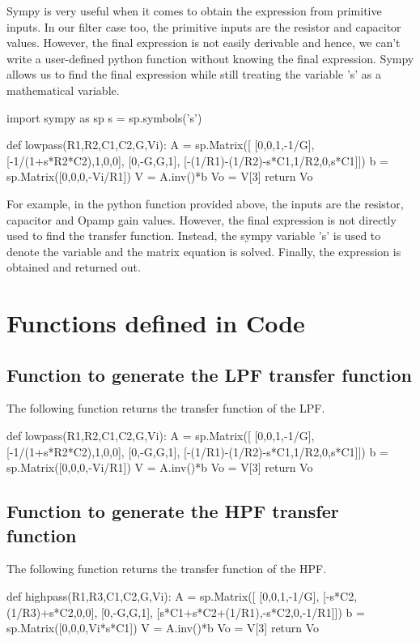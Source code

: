 \documentclass[12pt, a4paper]{article}
\begin{document}
Sympy is very useful when it comes to obtain the expression from primitive
inputs. In our filter case too, the primitive inputs are the resistor and capacitor
values. However, the final expression is not easily derivable and hence, we
can't write a user-defined python function without knowing the final expression.
Sympy allows us to find the final expression while still treating the variable 's'
as a mathematical variable.
\begin{py_code}
    import sympy as sp
    s = sp.symbols('s')

    def lowpass(R1,R2,C1,C2,G,Vi):
        A = sp.Matrix([ [0,0,1,-1/G], [-1/(1+s*R2*C2),1,0,0], [0,-G,G,1], [-(1/R1)-(1/R2)-s*C1,1/R2,0,s*C1]])
        b = sp.Matrix([0,0,0,-Vi/R1])
        V = A.inv()*b
        Vo = V[3]
        return Vo
\end{py_code}
For example, in the python function provided above, the inputs are the resistor,
capacitor and Opamp gain values. However, the final expression is not directly
used to find the transfer function. Instead, the sympy variable ’s’ is used to
denote the variable and the matrix equation is solved. Finally, the expression
is obtained and returned out.
\section{Functions defined in Code}
\subsection{Function to generate the LPF transfer function}
The following function returns the transfer function of the LPF.
\begin{py_code}
    def lowpass(R1,R2,C1,C2,G,Vi):
        A = sp.Matrix([ [0,0,1,-1/G], [-1/(1+s*R2*C2),1,0,0], [0,-G,G,1], [-(1/R1)-(1/R2)-s*C1,1/R2,0,s*C1]])
        b = sp.Matrix([0,0,0,-Vi/R1])
        V = A.inv()*b
        Vo = V[3]
        return Vo
\end{py_code}
\subsection{Function to generate the HPF transfer function}
The following function returns the transfer function of the HPF.
\begin{py_code}
    def highpass(R1,R3,C1,C2,G,Vi):
        A = sp.Matrix([ [0,0,1,-1/G], [-s*C2,(1/R3)+s*C2,0,0], [0,-G,G,1], [s*C1+s*C2+(1/R1),-s*C2,0,-1/R1]])
        b = sp.Matrix([0,0,0,Vi*s*C1])
        V = A.inv()*b
        Vo = V[3]
        return Vo
\end{py_code}
\end{document}
